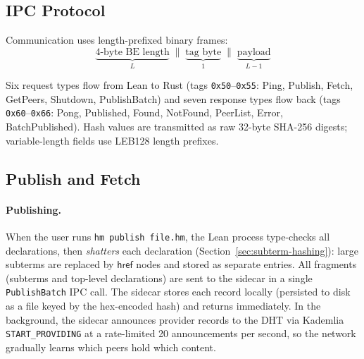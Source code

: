 \documentclass[11pt]{article}
\theoremstyle{definition}
\theoremstyle{plain}
\theoremstyle{remark}
\newcommand{\hrefE}{\textsf{href}}
\begin{document}
\subsection{IPC Protocol}

Communication uses length-prefixed binary frames:
\[
  \underbrace{4\text{-byte BE length}}_{L} \;\|\; \underbrace{\text{tag byte}}_{1} \;\|\; \underbrace{\text{payload}}_{L - 1}
\]

Six request types flow from Lean to Rust (tags \texttt{0x50}--\texttt{0x55}:
Ping, Publish, Fetch, GetPeers, Shutdown, PublishBatch) and seven response types
flow back (tags \texttt{0x60}--\texttt{0x66}: Pong, Published, Found, NotFound,
PeerList, Error, BatchPublished).
Hash values are transmitted as raw 32-byte SHA-256 digests;
variable-length fields use LEB128 length prefixes.

\subsection{Publish and Fetch}

\paragraph{Publishing.}
When the user runs \texttt{hm publish file.hm}, the Lean process type-checks
all declarations, then \emph{shatters} each declaration
(Section~\ref{sec:subterm-hashing}): large subterms are replaced by $\hrefE$
nodes and stored as separate entries.
All fragments (subterms and top-level declarations) are sent to the sidecar
in a single \texttt{PublishBatch} IPC call.
The sidecar stores each record locally (persisted to disk as a file keyed by
the hex-encoded hash) and returns immediately.
In the background, the sidecar announces provider records to the DHT via
Kademlia \texttt{START\_PROVIDING} at a rate-limited 20 announcements per
second, so the network gradually learns which peers hold which content.
\end{document}
